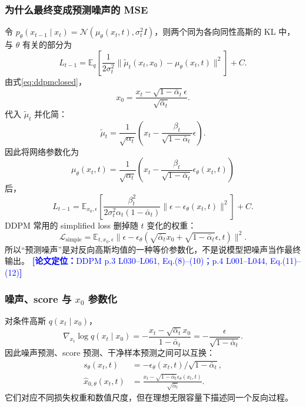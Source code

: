 \documentclass[11pt,a4paper]{ctexart}
\newcommand{\paperref}[1]{\textcolor{Blue}{\footnotesize\textbf{[论文定位：}#1\textbf{]}}}
\newcommand{\E}{\mathbb{E}}
\newcommand{\N}{\mathcal{N}}
\begin{document}
\subsubsection*{为什么最终变成预测噪声的 MSE}

令
$p_\theta(x_{t-1}\mid x_t)=\N(\mu_\theta(x_t,t),\sigma_t^2 I)$，则两个同为各向同性高斯的 KL 中，与 $\theta$ 有关的部分为
\begin{equation}
L_{t-1}=\E_q\left[\frac{1}{2\sigma_t^2}\|\tilde\mu_t(x_t,x_0)-\mu_\theta(x_t,t)\|^2\right]+C.
\end{equation}
由式\eqref{eq:ddpmclosed}，
\begin{equation}
x_0=\frac{x_t-\sqrt{1-\bar\alpha_t}\epsilon}{\sqrt{\bar\alpha_t}}.
\end{equation}
代入 $\tilde\mu_t$ 并化简：
\begin{equation}
\tilde\mu_t=\frac{1}{\sqrt{\alpha_t}}
\left(x_t-\frac{\beta_t}{\sqrt{1-\bar\alpha_t}}\epsilon\right).
\end{equation}
因此将网络参数化为
\begin{equation}
\mu_\theta(x_t,t)=\frac{1}{\sqrt{\alpha_t}}
\left(x_t-\frac{\beta_t}{\sqrt{1-\bar\alpha_t}}\epsilon_\theta(x_t,t)\right)
\end{equation}
后，
\begin{equation}
L_{t-1}=\E_{x_0,\epsilon}\left[
\frac{\beta_t^2}{2\sigma_t^2\alpha_t(1-\bar\alpha_t)}
\|\epsilon-\epsilon_\theta(x_t,t)\|^2\right]+C.
\end{equation}
DDPM 常用的 simplified loss 删掉随 $t$ 变化的权重：
\begin{equation}
\mathcal L_{\mathrm{simple}}=\E_{t,x_0,\epsilon}
\|\epsilon-\epsilon_\theta(\sqrt{\bar\alpha_t}x_0+\sqrt{1-\bar\alpha_t}\epsilon,t)\|^2.
\end{equation}
所以“预测噪声”是对反向高斯均值的一种等价参数化，不是说模型把噪声当作最终输出。
\paperref{DDPM p.3 L030--L061, Eq.(8)--(10)；p.4 L001--L044, Eq.(11)--(12)}

\subsubsection*{噪声、score 与 $x_0$ 参数化}

对条件高斯 $q(x_t\mid x_0)$，
\begin{equation}
\nabla_{x_t}\log q(x_t\mid x_0)
=-\frac{x_t-\sqrt{\bar\alpha_t}x_0}{1-\bar\alpha_t}
=-\frac{\epsilon}{\sqrt{1-\bar\alpha_t}}.
\end{equation}
因此噪声预测、score 预测、干净样本预测之间可以互换：
\begin{align}
s_\theta(x_t,t)&=-\epsilon_\theta(x_t,t)/\sqrt{1-\bar\alpha_t},\\
\hat x_{0,\theta}(x_t,t)&=\frac{x_t-\sqrt{1-\bar\alpha_t}\epsilon_\theta(x_t,t)}{\sqrt{\bar\alpha_t}}.
\end{align}
它们对应不同损失权重和数值尺度，但在理想无限容量下描述同一个反向过程。
\end{document}
